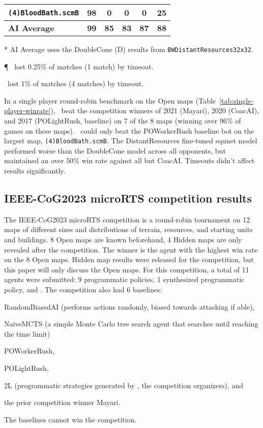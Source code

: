 \documentclass{article}
\begin{document}
\begin{table}[ht]
\begin{threeparttable}
\begin{tabular}{lcccc|c}
    \texttt{(4)BloodBath.scmB} & \textbf{98} & 0 & 0 & 0 & 25\tnote{\dag} \\
    \hline
    \textbf{AI Average}\tnote{*} & \textbf{99} & \textbf{85} & \textbf{83} & \textbf{87} & \textbf{88} \\
    \end{tabular}
    \begin{tablenotes}
    \item[*] AI Average uses the DoubleCone (D) results from \texttt{BWDistantResources32x32}.
    \item[\P] \agentName\ lost 0.25\% of matches (1 match) by timeout.
    \item[\dag] \agentName\ lost  1\% of matches (4 matches) by timeout.
    \end{tablenotes}
    \end{threeparttable}
\end{table}

In a single player round-robin benchmark on the Open maps (Table~\ref{tab:single-player-winrate}), \agentName\
beat the competition winners of 2021 (Mayari), 2020 (CoacAI), and 2017 (POLightRush,
baseline) on 7 of the 8 maps (winning over 96\% of games on these maps). \agentName\
could only beat the POWorkerRush baseline bot on the largest map,
\texttt{(4)BloodBath.scmB}. The DistantResources fine-tuned squnet model performed worse than the DoubleCone model
across all opponents, but maintained an over 50\% win rate against all but CoacAI. Timeouts didn't affect results significantly.

\subsection{IEEE-CoG2023 microRTS competition results}
The IEEE-CoG2023 microRTS competition is a round-robin tournament on 12 maps of
different sizes and distributions of terrain, resources, and starting units and
buildings. 8 Open maps are known beforehand, 4 Hidden maps are only revealed after the
competition. The winner is the agent with the highest win rate on the 8 Open maps.
Hidden map results were released for the competition, but this paper will only discuss
the Open maps. For
this competition, a total of 11 agents were submitted: 9 programmatic policies, 1
synthesized programmatic policy, and \agentName. The competition also had 6
baselines:
\begin{inparaenum}[(1)]
    \item RandomBiasedAI (performs actions randomly, biased towards attacking if able),
    \item NaiveMCTS (a simple Monte Carlo tree search agent that searches until reaching
    the time limit)
    \item POWorkerRush,
    \item POLightRush,
    \item 2L (programmatic strategies generated by \citet{Moraes2023ChoosingWY}, the
    competition organizers), and
    \item the prior competition winner Mayari.
\end{inparaenum}
The baselines cannot win the competition.
\end{document}

